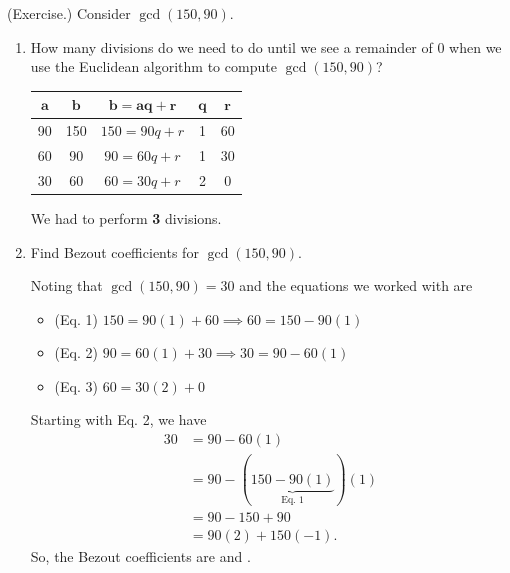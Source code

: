 \documentclass[letterpaper]{article}
\begin{document}
\begin{mdframed}
    (Exercise.) Consider $\gcd(150, 90)$.
    
    \begin{enumerate}
        \item How many divisions do we need to do until we see a remainder of 0 when we use the Euclidean algorithm to compute $\gcd(150, 90)$?
        \begin{mdframed}
            \begin{center}
                \begin{tabular}{|c|c|c|c|c|}
                    \hline 
                    $\mathbf{a}$ & $\mathbf{b}$ & $\mathbf{b = aq + r}$ & $\mathbf{q}$ & $\mathbf{r}$ \\ 
                    \hline 
                    90 & 150 & $150 = 90q + r$ & 1 & 60 \\ 
                    60 & 90 & $90 = 60q + r$ & 1 & 30 \\ 
                    30 & 60 & $60 = 30q + r$ & 2 & 0 \\ 
                    \hline 
                \end{tabular}
            \end{center}
            We had to perform \textbf{3} divisions. 
        \end{mdframed}

        \item Find Bezout coefficients for $\gcd(150, 90)$. 
        \begin{mdframed}
            Noting that $\gcd(150, 90) = 30$ and the equations we worked with are 
            \begin{itemize}
                \item (Eq. 1) $150 = 90(1) + 60 \implies 60 = 150 - 90(1)$
                \item (Eq. 2) $90 = 60(1) + 30 \implies 30 = 90 - 60(1)$
                \item (Eq. 3) $60 = 30(2) + 0$
            \end{itemize}
            Starting with Eq. 2, we have 
            \begin{equation*}
                \begin{aligned}
                    30 &= 90 - 60(1) \\ 
                        &= 90 - (\underbrace{150 - 90(1)}_{\text{Eq. 1}})(1) \\ 
                        &= 90 - 150 + 90 \\ 
                        &= 90(2) + 150(-1).
                \end{aligned}
            \end{equation*}
            So, the Bezout coefficients are  and .
        \end{mdframed}
    \end{enumerate}
\end{mdframed}
\end{document}
